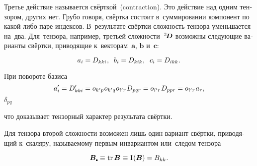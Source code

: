\begin{otherlanguage}{russian}

Третье действие называется свёрткой~(contraction). Это действие над одним тензором, других  нет. Грубо говоря, свёртка состоит в~суммировании компонент по какой\hbox{-}либо паре индексов. В~результате свёртки сложность тензора уменьшается на~два. Для~тензора, например, третьей сложности~${^3\hspace{-0.33ex}\bm{D}}$ возможны следующие варианты свёртки, приводящие к~векторам~${\bm{a}}$, ${\bm{b}}$ и~${\bm{c}}$:

\nopagebreak\vspace{-0.2em}\begin{equation}\label{action:3}
a_{i} = D_{kki} \hspace{.1ex} ,
\;\;
b_{i} = D_{kik} \hspace{.1ex} ,
\;\;
c_{i} = D_{ikk} \hspace{.1ex} .
\end{equation}

\vspace{-0.16em} При повороте базиса
\[
a'_{i} = D'_{kki} = \tikzmark{BeginDeltaPQBrace} {\cosinematrix{k'p} \hspace{.1ex} \cosinematrix{k'q}} \tikzmark{EndDeltaPQBrace} \hspace{.1ex} \cosinematrix{i'r} \hspace{0.16ex} D_{pqr} = \cosinematrix{i'r} \hspace{.16ex} D_{ppr} = \cosinematrix{i'r} \hspace{0.16ex} a_{r},
\]
%
{${\scriptstyle \delta_{pq}}$}

\vspace{-0.25em} \noindent что доказывает тензорный характер результата свёртки.

Для тензора второй сложности возможен лишь один вариант свёртки, приводящий к~скаляру, называемому первым инвариантом или~следом тензора

\nopagebreak\vspace{-0.2em}\begin{equation*}
\bm{B}\tracedot \hspace{.1ex} \equiv \hspace{.1ex}
\operatorname{tr} \bm{B} \hspace{.1ex} \equiv \hspace{.1ex}
\mathrm{I}\hspace{0.16ex}(\bm{B})
= B_{kk}
\hspace{.1ex} .
\end{equation*}


\end{otherlanguage}
